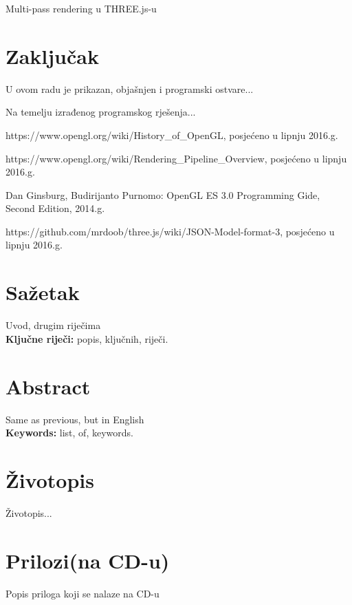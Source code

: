 \documentclass[a4paper,12pt]{extarticle}
\begin{document}
Multi-pass rendering u THREE.js-u


\section{Zaključak}

U ovom radu je prikazan, objašnjen i programski ostvare...


Na temelju izrađenog programskog rješenja...

\begin{thebibliography}{9}

	https://www.opengl.org/wiki/History\_of\_OpenGL, posjećeno u lipnju 2016.g.

	https://www.opengl.org/wiki/Rendering\_Pipeline\_Overview, posjećeno u lipnju 2016.g.
	
	Dan Ginsburg, Budirijanto Purnomo: OpenGL ES 3.0 Programming Gide, Second Edition, 2014.g.

	https://github.com/mrdoob/three.js/wiki/JSON-Model-format-3, posjećeno u lipnju 2016.g.

\end{thebibliography}

\section*{Sažetak}

Uvod, drugim riječima\\


{\bfseries Ključne riječi:} popis, ključnih, riječi.

\section*{Abstract}

Same as previous, but in English\\


{\bfseries Keywords:} list, of, keywords.

\section*{Životopis}

Životopis... %

\section*{Prilozi(na CD-u)}

Popis priloga koji se nalaze na CD-u
\end{document}
